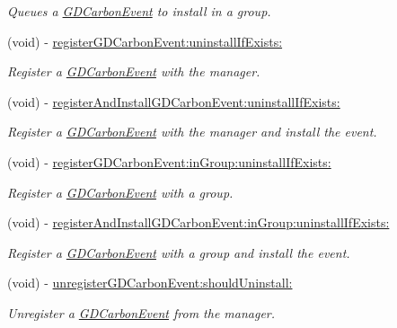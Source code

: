 \begin{DoxyCompactItemize}
\begin{DoxyCompactList}\small\item\em Queues a \hyperlink{interface_g_d_carbon_event}{GDCarbonEvent} to install in a group. \item\end{DoxyCompactList}\item 
(void) -\/ \hyperlink{interface_g_d_carbon_event_manager_a4f55b9d19e99d98b3cbb62ed47daabfb}{registerGDCarbonEvent:uninstallIfExists:}
\begin{DoxyCompactList}\small\item\em Register a \hyperlink{interface_g_d_carbon_event}{GDCarbonEvent} with the manager. \item\end{DoxyCompactList}\item 
(void) -\/ \hyperlink{interface_g_d_carbon_event_manager_ab5c5be29227c0ac1ff709cf46bb44246}{registerAndInstallGDCarbonEvent:uninstallIfExists:}
\begin{DoxyCompactList}\small\item\em Register a \hyperlink{interface_g_d_carbon_event}{GDCarbonEvent} with the manager and install the event. \item\end{DoxyCompactList}\item 
(void) -\/ \hyperlink{interface_g_d_carbon_event_manager_ac96cda5cbfaed699354a96a76b2e0fcd}{registerGDCarbonEvent:inGroup:uninstallIfExists:}
\begin{DoxyCompactList}\small\item\em Register a \hyperlink{interface_g_d_carbon_event}{GDCarbonEvent} with a group. \item\end{DoxyCompactList}\item 
(void) -\/ \hyperlink{interface_g_d_carbon_event_manager_a5bb7116bfbb92eb5bf5651192c855611}{registerAndInstallGDCarbonEvent:inGroup:uninstallIfExists:}
\begin{DoxyCompactList}\small\item\em Register a \hyperlink{interface_g_d_carbon_event}{GDCarbonEvent} with a group and install the event. \item\end{DoxyCompactList}\item 
(void) -\/ \hyperlink{interface_g_d_carbon_event_manager_a786c5f3fb13179cec26b22d240c5cc53}{unregisterGDCarbonEvent:shouldUninstall:}
\begin{DoxyCompactList}\small\item\em Unregister a \hyperlink{interface_g_d_carbon_event}{GDCarbonEvent} from the manager. \item\end{DoxyCompactList}\item 

\end{DoxyCompactItemize}
